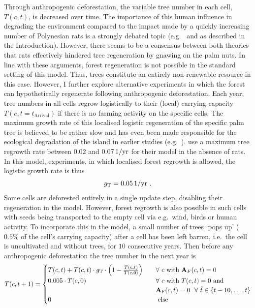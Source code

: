 Through anthropogenic deforestation, the variable tree number in each cell, $T(c,t)$, is decreased over time.
The importance of this human influence in degrading the environment compared to the impact made by a quickly increasing number of Polynesian rats is a strongly debated topic (e.g.\ \citet{Bahn2017} and \citet{Hunt2007} as described in the Introduction).
However, there seems to be a consensus between both theories that rats effectively hindered tree regeneration by gnawing on the palm nuts.
In line with these arguments, forest regeneration is not possible in the standard setting of this model.
Thus, trees constitute an entirely non-renewable resource in this case. 
However, I further explore alternative experiments in which the forest can hypothetically regenerate following anthropogenic deforestation.
Each year, tree numbers in all cells regrow logistically to their (local) carrying capacity $T(c,t=t_\text{Arrival})$ if there is no farming activity on the specific cells.
The maximum growth rate of this localised logistic regeneration of the specific palm tree is believed to be rather slow and has even been made responsible for the ecological degradation of the island in earlier studies (e.g.\ \citet{Brander1998}).
\citet{Brandt2015} use a maximum tree regrowth rate between $0.02$ and $0.07 \, \rm{1/yr}$ for their model in the absence of rats.\TODO
In this model, experiments, in which localised forest regrowth is allowed, the logistic growth rate is thus 
\begin{equation}
g_{\rm T} = 0.05\, \rm{1/yr} \ .
\end{equation}
Some cells are deforested entirely in a single update step, disabling their regeneration in the model. 
However, forest regrowth is also possible in such cells with seeds being transported to the empty cell via e.g.\ wind, birds or human activity.
To incorporate this in the model, a small number of trees `pops up' ($0.5\%$ of the cell's carrying capacity) after a cell has been left barren, i.e.\ the cell is uncultivated and without trees, for $10$ consecutive years.
Then before any anthropogenic deforestation the tree number in the next year is
\begin{equation}
T(c,t+1)= \begin{cases}
T(c,t) + T(c,t) \cdot g_{\rm T} \cdot \left(1- \frac{T(c,t)}{T(c,0)}\right) \quad & \forall \ c \text{ with } \mathbf{A}_F(c,t)=0 \\
0.005 \cdot T(c,0)  & \forall  \ c \text{ with } T(c,t)=0 \text{ and}\\
& \mathbf{A}_{\rm F}(c,\hat{t})=0 \  \ \forall \  \hat{t} \in \{t-10, \ldots, t\} \\
0 & \text{ else }
\end{cases}
\end{equation}

